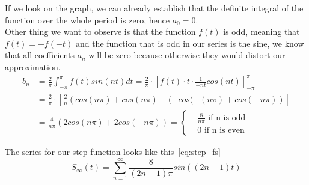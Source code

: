 \documentclass{article}
\begin{document}
    If we look on the graph, we can already establish that the definite integral
    of the function over the whole period is zero, hence $a_0 = 0$. \\


    Other thing we want to observe is that the function $f(t)$ is odd, meaning
    that \textbf{$f(t) = -f(-t)$} and the function that is odd in our series is
    the sine, we know that all coefficients $a_n$ will be zero because otherwise
    they would distort our approximation.
    \begin{equation}
    \begin{split}
        b_n & = \frac{2}{\pi}\int_{-\pi}^{\pi}f(t)sin(nt)dt 
        = \frac{2}{\pi} \cdot \left[f(t)\cdot t \cdot \frac{1}{-nt}cos(nt)\right]_{-\pi}^{\pi} \\
        & = \frac{2}{\pi} \cdot \left[\frac{2}{n}\left(cos(n\pi) + cos(n\pi)
        - (-cos(-(n\pi) + cos(-n\pi) \right)\right] \\
        & = \frac{4}{n\pi}\left(2cos(n\pi) + 2cos(-n\pi)\right) = 
        \begin{cases} 
            & \frac{8}{n\pi} \text{ if n is odd} \\
            & 0 \text{ if n is even}
        \end{cases} 
    \end{split}
    \end{equation}
    
    The series for our step function looks like this~\eqref{eq:step_fs}
    \begin{equation}\label{eq:step_fs}
        S_\infty(t) = \sum_{n=1}^{\infty}\frac{8}{(2n-1)\pi}sin((2n - 1)t)
    \end{equation}
\end{document}
